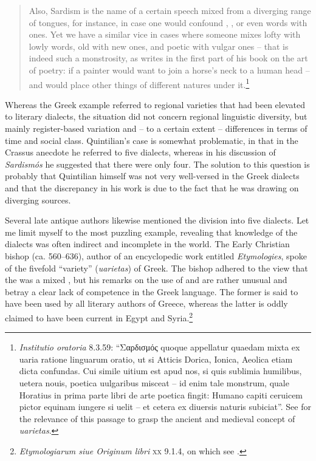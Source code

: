 \begin{quote}
Also, Sardism is the name of a certain speech mixed from a diverging range of tongues, for instance, in case one would confound , , or even  words with  ones. Yet we have a similar vice in cases where someone mixes lofty with lowly words, old with new ones, and poetic with vulgar ones – that is indeed such a monstrosity, as  writes in the first part of his book on the art of poetry: if a painter would want to join a horse’s neck to a human head – and would place other things of different natures under it.\footnote{\textit{Institutio oratoria} {8.3.59: “Σαρδισμός quoque appellatur quaedam mixta ex uaria ratione linguarum oratio, ut si Atticis Dorica, Ionica, Aeolica etiam dicta confundas. Cui simile uitium est apud nos, si quis sublimia humilibus, uetera nouis, poetica uulgaribus misceat – id enim tale monstrum, quale Horatius in prima parte libri de arte poetica fingit: Humano capiti ceruicem pictor equinam iungere si uelit – et cetera ex diuersis naturis subiciat”. See \citet[46]{Carruthers2009} for the relevance of this passage to grasp the ancient and medieval concept of} {\textit{uarietas}}.}
\end{quote}

Whereas the Greek example referred to regional varieties that had been elevated to literary dialects, the  situation did not concern regional linguistic diversity, but mainly register-based variation and – to a certain extent – differences in terms of time and social class. Quintilian’s case is somewhat problematic, in that in the Crassus anecdote he referred to five dialects, whereas in his discussion of \textit{Sardismós} he suggested that there were only four. The solution to this question is probably that Quintilian himself was not very well-versed in the Greek dialects and that the discrepancy in his work is due to the fact that he was drawing on diverging sources.

Several late antique  authors likewise mentioned the division into five dialects. Let me limit myself to the most puzzling example, revealing that knowledge of the dialects was often indirect and incomplete in the  world. The Early Christian bishop  (ca. 560–636), author of an encyclopedic work entitled \textit{Etymologies}, spoke of the fivefold “variety” (\textit{uarietas}) of Greek. The bishop adhered to the view that the  was a mixed , but his remarks on the use of  and  are rather unusual and betray a clear lack of competence in the Greek language. The former is said to have been used by all literary authors of Greece, whereas the latter is oddly claimed to have been current in Egypt and Syria.\footnote{\textit{Etymologiarum siue Originum libri} \textsc{xx} 9.1.4, on which see \citet[227–229]{Denecker2017}.}

